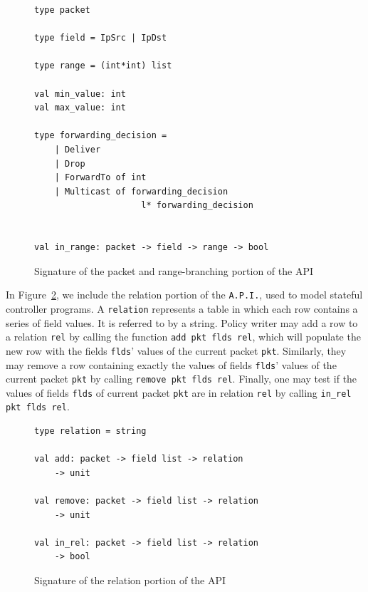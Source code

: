 \documentclass[preprint]{sigplanconf}
\begin{document}
\begin{figure}[ht]
  \begin{lstlisting}
type packet

type field = IpSrc | IpDst 

type range = (int*int) list

val min_value: int 
val max_value: int

type forwarding_decision =
	| Deliver
	| Drop
	| ForwardTo of int
	| Multicast of forwarding_decision
                     l* forwarding_decision


val in_range: packet -> field -> range -> bool
\end{lstlisting}

\caption{Signature of the packet and range-branching portion of the API}
\label{fig:range_api}
\end{figure}



In Figure~\ref{fig:rel_api}, we include the relation portion of the \lstinline|A.P.I.|, used to model stateful controller programs. A \lstinline|relation| represents a table in which each row contains a series of field values. It is referred to by a string. Policy writer may add a row to a relation \lstinline|rel| by calling the function \lstinline|add pkt flds rel|, which will populate the new row with the fields \lstinline|flds|' values of the current packet \lstinline|pkt|. Similarly, they may remove a row containing exactly the values of fields \lstinline|flds|' values of the current packet \lstinline|pkt| by calling \lstinline|remove pkt flds rel|. Finally, one may test if the values of fields \lstinline|flds| of current packet \lstinline|pkt| are in relation \lstinline|rel| by calling \lstinline|in_rel pkt flds rel|.



\begin{figure}[ht]
  \begin{lstlisting}
type relation = string

val add: packet -> field list -> relation
    -> unit

val remove: packet -> field list -> relation
    -> unit

val in_rel: packet -> field list -> relation
    -> bool
\end{lstlisting}

\caption{Signature of the relation portion of the API}
\label{fig:rel_api}
\end{figure}
\end{document}

